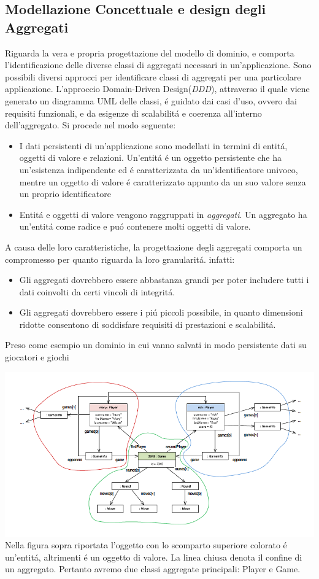 \subsection{Modellazione Concettuale e design degli Aggregati}
Riguarda la vera e propria progettazione del modello di dominio, e comporta l'identificazione
delle diverse classi di aggregati necessari in un'applicazione.
Sono possibili diversi approcci per identificare classi di aggregati per una particolare applicazione.
L'approccio Domain-Driven Design(\emph{DDD}), attraverso il quale viene generato un diagramma UML delle classi,
é guidato dai casi d'uso, ovvero dai requisiti funzionali, e da esigenze di scalabilitá e coerenza all'interno dell'aggregato.
Si procede nel modo seguente:
\begin{itemize}
    \item I dati persistenti di un'applicazione sono modellati in termini di entitá, oggetti di valore e
    relazioni.
    Un'entitá é un oggetto persistente che ha un'esistenza indipendente ed é caratterizzata da un'identificatore
    univoco, mentre un oggetto di valore é caratterizzato appunto da un suo valore senza un proprio identificatore
    \item Entitá e oggetti di valore vengono raggruppati in \emph{aggregati}.
    Un aggregato ha un'entitá come radice e puó contenere molti oggetti di valore.
\end{itemize}
A causa delle loro caratteristiche, la progettazione degli aggregati comporta un compromesso per quanto riguarda
la loro granularitá. infatti:
\begin{itemize}
    \item Gli aggregati dovrebbero essere abbastanza grandi per poter includere tutti i dati coinvolti da
    certi vincoli di integritá.
    \item Gli aggregati dovrebbero essere i piú piccoli possibile, in quanto dimensioni ridotte consentono di
    soddisfare requisiti di prestazioni e scalabilitá.
\end{itemize}
Preso come esempio un dominio in cui vanno salvati in modo persistente dati su giocatori e giochi

\includegraphics[width=1\textwidth]{img/designAggregati}
Nella figura sopra riportata l'oggetto con lo scomparto superiore colorato é un'entitá, altrimenti
é un oggetto di valore. La linea chiusa denota il confine di un aggregato.
Pertanto avremo due classi aggregate principali: Player e Game.

